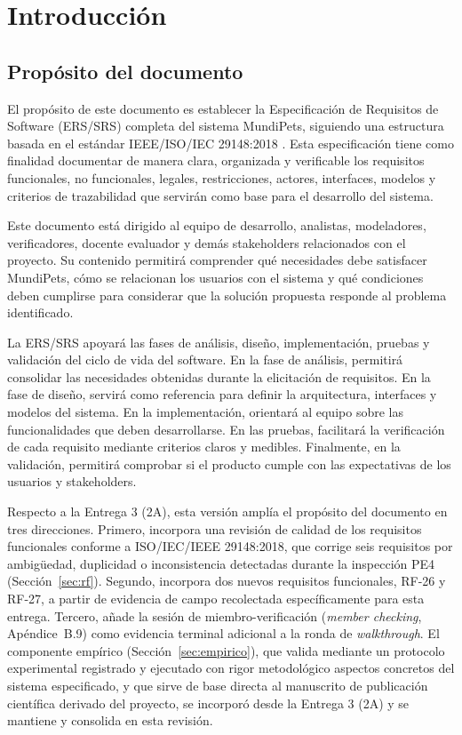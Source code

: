 \documentclass[journal,onecolumn]{IEEEtran}
\begin{document}
	\section{Introducción}
	
	\subsection{Propósito del documento}
	\label{sec:proposito}
	
	El propósito de este documento es establecer la Especificación de Requisitos de
	Software (ERS/SRS) completa del sistema MundiPets, siguiendo una estructura
	basada en el estándar IEEE/ISO/IEC 29148:2018 \cite{iso29148}. Esta
	especificación tiene como finalidad documentar de manera clara, organizada y
	verificable los requisitos funcionales, no funcionales, legales, restricciones,
	actores, interfaces, modelos y criterios de trazabilidad que servirán como base
	para el desarrollo del sistema.
	
	Este documento está dirigido al equipo de desarrollo, analistas, modeladores,
	verificadores, docente evaluador y demás stakeholders relacionados con el
	proyecto. Su contenido permitirá comprender qué necesidades debe satisfacer
	MundiPets, cómo se relacionan los usuarios con el sistema y qué condiciones
	deben cumplirse para considerar que la solución propuesta responde al problema
	identificado.
	
	La ERS/SRS apoyará las fases de análisis, diseño, implementación, pruebas y
	validación del ciclo de vida del software. En la fase de análisis, permitirá
	consolidar las necesidades obtenidas durante la elicitación de requisitos. En
	la fase de diseño, servirá como referencia para definir la arquitectura,
	interfaces y modelos del sistema. En la implementación, orientará al equipo
	sobre las funcionalidades que deben desarrollarse. En las pruebas, facilitará
	la verificación de cada requisito mediante criterios claros y medibles.
	Finalmente, en la validación, permitirá comprobar si el producto cumple con
	las expectativas de los usuarios y stakeholders.
	
	Respecto a la Entrega 3 (2A), esta versión amplía el propósito del documento
	en tres direcciones. Primero, incorpora una revisión de calidad de los
	requisitos funcionales conforme a ISO/IEC/IEEE 29148:2018, que corrige seis
	requisitos por ambigüedad, duplicidad o inconsistencia detectadas durante la
	inspección PE4 (Sección~\ref{sec:rf}). Segundo, incorpora dos nuevos
	requisitos funcionales, RF-26 y RF-27, a partir de evidencia de campo
	recolectada específicamente para esta entrega. Tercero, añade la sesión de
	miembro-verificación (\emph{member checking}, Apéndice~B.9) como evidencia
	terminal adicional a la ronda de \emph{walkthrough}. El componente empírico
	(Sección~\ref{sec:empirico}), que valida mediante un protocolo experimental
	registrado y ejecutado con rigor metodológico aspectos concretos del sistema
	especificado, y que sirve de base directa al manuscrito de publicación
	científica derivado del proyecto, se incorporó desde la Entrega 3 (2A) y se
	mantiene y consolida en esta revisión.
	
\end{document}
